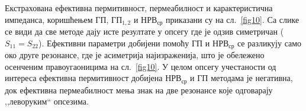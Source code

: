 \documentclass[main.tex]{subfiles}
\begin{document}

Екстрахована ефективна пермитивност, пермеабилност и карактеристична импеданса, коришћењем $ГП$, $ГП_{1,2}$ и $НРВ_{ср}$ приказани су на сл.~\ref{fig10}. Са слике се види да све методе дају исте резултате у опсегу где је одзив симетричан ($S_{11} = S_{22}$). Ефективни параметри добијени помоћу ГП и $НРВ_{ср}$ се разликују само око друге резонансе, где је асиметрија најизраженија, што је обележено осенченим правоугаоницима на сл.~\ref{fig10}. У целом опсегу учестаности од интереса ефективна пермитивност добијена $НРВ_{ср}$ и ГП методама је негативна, док ефективна пермеабилност мења знак на две резонансе које одговарају ,,леворуким`` опсезима.
\end{document}
